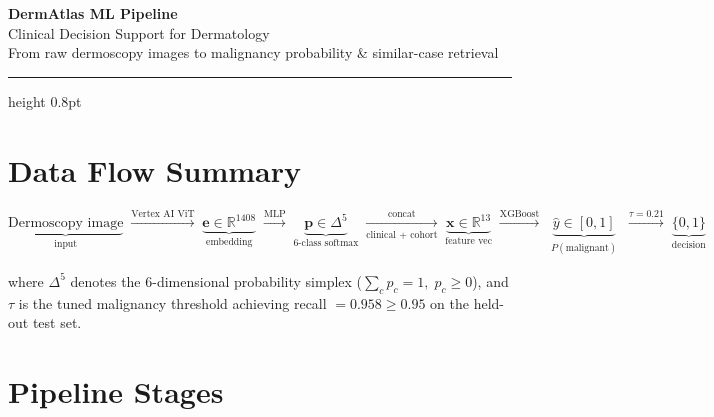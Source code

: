 \documentclass[12pt, a4paper]{article}
\begin{document}
\begin{center}
  {\LARGE\bfseries\color{rootcol} DermAtlas ML Pipeline}\\[0.4em]
  {\large\color{stagecol} Clinical Decision Support for Dermatology}\\[0.2em]
  {\small\color{gray} From raw dermoscopy images to malignancy probability \& similar-case retrieval}
\end{center}

\vspace{0.5em}
\hrule height 0.8pt
\vspace{1em}

\section{Data Flow Summary}

\[
\underbrace{\text{Dermoscopy image}}_{\text{input}}
\;\xrightarrow{\text{Vertex AI ViT}}\;
\underbrace{\mathbf{e} \in \mathbb{R}^{1408}}_{\text{embedding}}
\;\xrightarrow{\text{MLP}}\;
\underbrace{\mathbf{p} \in \Delta^5}_{\text{6-class softmax}}
\;\xrightarrow[\text{clinical + cohort}]{\text{concat}}\;
\underbrace{\mathbf{x} \in \mathbb{R}^{13}}_{\text{feature vec}}
\;\xrightarrow{\text{XGBoost}}\;
\underbrace{\hat{y} \in [0,1]}_{\substack{P(\text{malignant})}}
\;\xrightarrow{\tau = 0.21}\;
\underbrace{\{0,1\}}_{\text{decision}}
\]

\vspace{0.5em}

where $\Delta^5$ denotes the 6-dimensional probability simplex
($\sum_{c} p_c = 1,\; p_c \geq 0$),
and $\tau$ is the tuned malignancy threshold achieving
recall $= 0.958 \geq 0.95$ on the held-out test set.

\vspace{1em}

\section{Pipeline Stages}
\end{document}
